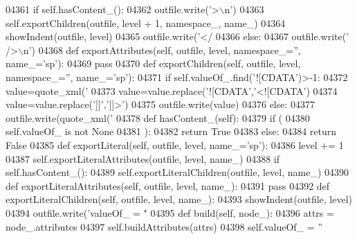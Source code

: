 \begin{DoxyCode}
{{{{{{{{{{{{{{{{{{{{{{{{{{{{{{{{{{{{{{{{{{{{{{{{{{{{{{{{{{{{{{{{{{{{{{{{{{{{{{{{{{{{{{{{{{{{{{{{{{{{{{{{{{{{{{{{{{{{{{{{{{{{{{{{{{{{{{{{{{{{{{{{{{{{{{{{{{{{{{{{{{{{{{{{{{{{{{{{{{{{{{{{{{{{{{{{{{{{{{{{{{{{{{{{{{{{{{{{{{{{{{{{{{{{{{{{{{{{{{{{{{{{{{{{{{{{{{{{{{{{{{{{{{{{{{{{{{{{{{{{{{{04361         \textcolor{keywordflow}{if} self.hasContent_():
04362             outfile.write(\textcolor{stringliteral}{'>\(\backslash\)n'})
04363             self.exportChildren(outfile, level + 1, namespace\_, name\_)
04364             showIndent(outfile, level)
04365             outfile.write(\textcolor{stringliteral}{'</%
04366         \textcolor{keywordflow}{else}:
04367             outfile.write(\textcolor{stringliteral}{' />\(\backslash\)n'})
04368     \textcolor{keyword}{def }exportAttributes(self, outfile, level, namespace\_='', name\_='sp'):
04369         \textcolor{keywordflow}{pass}
04370     \textcolor{keyword}{def }exportChildren(self, outfile, level, namespace\_='', name\_='sp'):
04371         \textcolor{keywordflow}{if} self.valueOf\_.find(\textcolor{stringliteral}{'![CDATA'})>-1:
04372             value=quote_xml(\textcolor{stringliteral}{'%
04373             value=value.replace(\textcolor{stringliteral}{'![CDATA'},\textcolor{stringliteral}{'<![CDATA'})
04374             value=value.replace(\textcolor{stringliteral}{']]'},\textcolor{stringliteral}{']]>'})
04375             outfile.write(value)
04376         \textcolor{keywordflow}{else}:
04377             outfile.write(quote_xml(\textcolor{stringliteral}{'%
04378     \textcolor{keyword}{def }hasContent_(self):
04379         \textcolor{keywordflow}{if} (
04380             self.valueOf_ \textcolor{keywordflow}{is} \textcolor{keywordflow}{not} \textcolor{keywordtype}{None}
04381             ):
04382             \textcolor{keywordflow}{return} \textcolor{keyword}{True}
04383         \textcolor{keywordflow}{else}:
04384             \textcolor{keywordflow}{return} \textcolor{keyword}{False}
04385     \textcolor{keyword}{def }exportLiteral(self, outfile, level, name\_='sp'):
04386         level += 1
04387         self.exportLiteralAttributes(outfile, level, name\_)
04388         \textcolor{keywordflow}{if} self.hasContent_():
04389             self.exportLiteralChildren(outfile, level, name\_)
04390     \textcolor{keyword}{def }exportLiteralAttributes(self, outfile, level, name\_):
04391         \textcolor{keywordflow}{pass}
04392     \textcolor{keyword}{def }exportLiteralChildren(self, outfile, level, name\_):
04393         showIndent(outfile, level)
04394         outfile.write(\textcolor{stringliteral}{'valueOf\_ = "%
04395     \textcolor{keyword}{def }build(self, node\_):
04396         attrs = node\_.attributes
04397         self.buildAttributes(attrs)
04398         self.valueOf_ = \textcolor{stringliteral}{''}
}}}}}}}}}}}}}}}}}}}}}}}}}}}}}}}}}}}}}}}}}}}}}}}}}}}}}}}}}}}}}}}}}}}}}}}}}}}}}}}}}}}}}}}}}}}}}}}}}}}}}}}}}}}}}}}}}}}}}}}}}}}}}}}}}}}}}}}}}}}}}}}}}}}}}}}}}}}}}}}}}}}}}}}}}}}}}}}}}}}}}}}}}}}}}}}}}}}}}}}}}}}}}}}}}}}}}}}}}}}}}}}}}}}}}}}}}}}}}}}}}}}}}}}}}}}}}}}}}}}}}}}}}}}}}}}}}}}}}}}}}}}}}}}
\end{DoxyCode}
